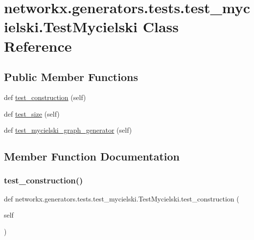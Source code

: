 \hypertarget{classnetworkx_1_1generators_1_1tests_1_1test__mycielski_1_1TestMycielski}{}\section{networkx.\+generators.\+tests.\+test\+\_\+mycielski.\+Test\+Mycielski Class Reference}
\label{classnetworkx_1_1generators_1_1tests_1_1test__mycielski_1_1TestMycielski}
\subsection*{Public Member Functions}
\begin{DoxyCompactItemize}
\item 
def \hyperlink{classnetworkx_1_1generators_1_1tests_1_1test__mycielski_1_1TestMycielski_a0b14bda3e2c7fdba964950d38607367b}{test\+\_\+construction} (self)
\item 
def \hyperlink{classnetworkx_1_1generators_1_1tests_1_1test__mycielski_1_1TestMycielski_a2ac8de8646b16771df008435b756a61d}{test\+\_\+size} (self)
\item 
def \hyperlink{classnetworkx_1_1generators_1_1tests_1_1test__mycielski_1_1TestMycielski_ad8de903a72767f4e900a8d2bc3d36d51}{test\+\_\+mycielski\+\_\+graph\+\_\+generator} (self)
\end{DoxyCompactItemize}


\subsection{Member Function Documentation}
\mbox{\label{classnetworkx_1_1generators_1_1tests_1_1test__mycielski_1_1TestMycielski_a0b14bda3e2c7fdba964950d38607367b}} 
\subsubsection{\texorpdfstring{test\+\_\+construction()}{test\_construction()}}
{\footnotesize\ttfamily def networkx.\+generators.\+tests.\+test\+\_\+mycielski.\+Test\+Mycielski.\+test\+\_\+construction (\begin{DoxyParamCaption}\item[{}]{self }\end{DoxyParamCaption})}

